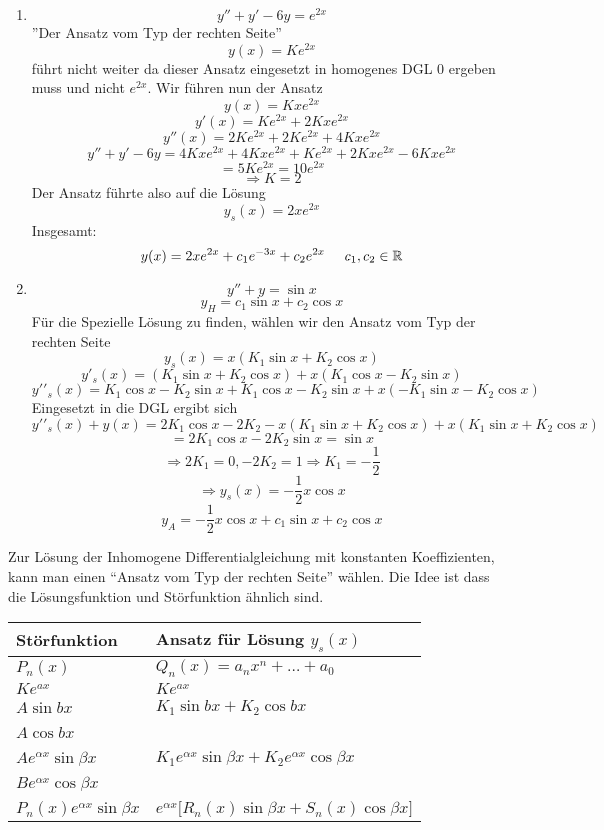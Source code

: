 \begin{enumerate}[\indent 3.]
\item $$y''+y'-6y=e^{2x}$$''Der Ansatz vom Typ der rechten Seite''$$y(x)=Ke^{2x}$$ führt nicht weiter da dieser Ansatz eingesetzt in homogenes DGL 0 ergeben muss und nicht $e^{2x}$. Wir führen nun der Ansatz
$$y(x)=Kxe^{2x}$$
$$y'(x) = K{e^{2x}} + 2Kx{e^{2x}}$$
$$y''(x) = 2K{e^{2x}} + 2K{e^{2x}} + 4Kx{e^{2x}}$$
$$y'' + y' - 6y = 4Kx{e^{2x}} + 4Kx{e^{2x}} + K{e^{2x}} + 2Kx{e^{2x}} - 6Kx{e^{2x}}$$
$$ = 5K{e^{2x}} = 10{e^{2x}}$$
$$\Rightarrow K=2$$
Der Ansatz führte also auf die Lösung $$y_s(x)=2xe^{2x}$$
Insgesamt: $$y(x)=2xe^{2x}+c_1e^{-3x}+c_2e^{2x}\text{\hspace{5mm}}c_1,c_2\in\mathbb{R}$$
\item $$y''+y=\sin x$$$$y_H=c_1\sin x+c_2\cos x$$
Für die Spezielle Lösung zu finden, wählen wir den Ansatz vom Typ der rechten Seite
$${y_s}(x) = x\left( {{K_1}\sin x + {K_2}\cos x} \right)$$
$$y{'_s}(x) = \left( {{K_1}\sin x + {K_2}\cos x} \right) + x\left( {{K_1}\cos x - {K_2}\sin x} \right)$$
$$y'{'_s}(x) = {K_1}\cos x - {K_2}\sin x + {K_1}\cos x - {K_2}\sin x + x\left( { - {K_1}\sin x - {K_2}\cos x} \right)$$
Eingesetzt in die DGL ergibt sich
$$y'{'_s}(x) + y(x) = 2{K_1}\cos x - 2{K_2} - x({K_1}\sin x + {K_2}\cos x) + x({K_1}\sin x + {K_2}\cos x)$$
$$=2K_1\cos x-2K_2 \sin x=\sin x$$
$$\Rightarrow 2K_1=0, -2K_2=1\Rightarrow K_1=-\frac{1}{2}$$
$$\Rightarrow y_s(x)=-\frac{1}{2}x\cos x$$
$$y_A=-\frac{1}{2}x\cos x+c_1 \sin x+c_2\cos x$$
\end{enumerate}
Zur Lösung der Inhomogene Differentialgleichung mit konstanten Koeffizienten, kann man einen ``Ansatz vom Typ der rechten Seite'' wählen. Die Idee ist dass die Lösungsfunktion und Störfunktion ähnlich sind.

\renewcommand{\arraystretch}{1.6}
\begin{tabularx}{\textwidth}{|Y|Y|}
\hline
Störfunktion & Ansatz für Lösung $y_s(x)$  \\\hline\hline
$P_n(x)$        & $Q_n(x)=a_nx^n+\dots+a_0$  \\ [1.5ex]\hline
$Ke^{ax}$        & $Ke^{ax}$  \\ [1.5ex]\hline
$A\sin bx$        & $K_1\sin bx +K_2\cos bx $  \\ [1.5ex]
$A\cos bx$        & ~  \\ [1.5ex]\hline
$Ae^{\alpha x}\sin \beta x$        & $K_1e^{\alpha x}\sin\beta x+K_2 e^{\alpha x}\cos\beta x$  \\ [1.5ex]
$Be^{\alpha x}\cos \beta x$        & ~  \\ [1.5ex]\hline
$P_n(x)e^{\alpha x}\sin\beta x$        & $e^{\alpha x}\lbrack R_n(x)\sin\beta x+S_n(x)\cos\beta x\rbrack$  \\ [1.5ex]\hline
 \end{tabularx}\\

